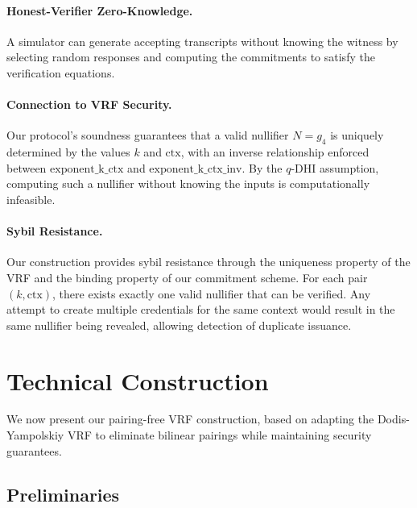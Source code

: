 \paragraph{Honest-Verifier Zero-Knowledge.} A simulator can generate accepting transcripts without knowing the witness by selecting random responses and computing the commitments to satisfy the verification equations.

\paragraph{Connection to VRF Security.} Our protocol's soundness guarantees that a valid nullifier $N = g_4$ is uniquely determined by the values $k$ and $\text{ctx}$, with an inverse relationship enforced between $\text{exponent\_k\_ctx}$ and $\text{exponent\_k\_ctx\_inv}$. By the $q$-DHI assumption, computing such a nullifier without knowing the inputs is computationally infeasible.

\paragraph{Sybil Resistance.} Our construction provides sybil resistance through the uniqueness property of the VRF and the binding property of our commitment scheme. For each pair $(k, \text{ctx})$, there exists exactly one valid nullifier that can be verified. Any attempt to create multiple credentials for the same context would result in the same nullifier being revealed, allowing detection of duplicate issuance.

















\section{Technical Construction}

We now present our pairing-free VRF construction, based on adapting the Dodis-Yampolskiy VRF to eliminate bilinear pairings while maintaining security guarantees.

\subsection{Preliminaries}

